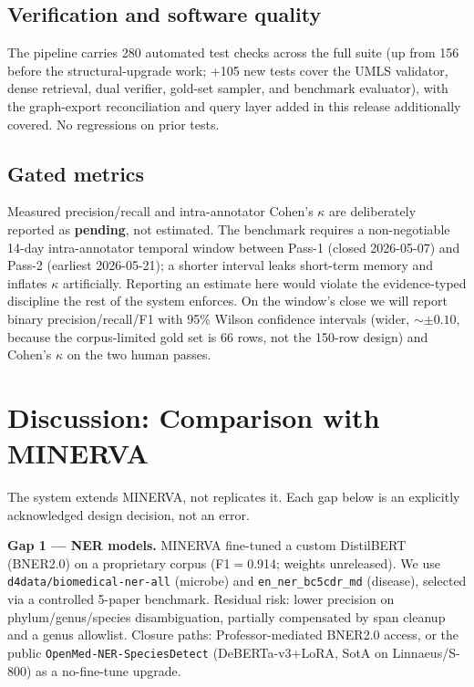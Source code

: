\documentclass[10pt,twocolumn,letterpaper]{article}
\begin{document}
\subsection{Verification and software quality}

The pipeline carries 280 automated test checks across the full suite (up from
156 before the structural-upgrade work; +105 new tests cover the UMLS
validator, dense retrieval, dual verifier, gold-set sampler, and benchmark
evaluator), with the graph-export reconciliation and query layer added in
this release additionally covered. No regressions on prior tests.

\subsection{Gated metrics}
\label{sec:eval}

Measured precision/recall and intra-annotator Cohen's $\kappa$ are
deliberately reported as \textbf{pending}, not estimated. The benchmark
requires a non-negotiable 14-day intra-annotator temporal window between
Pass-1 (closed 2026-05-07) and Pass-2 (earliest 2026-05-21); a shorter
interval leaks short-term memory and inflates $\kappa$ artificially.
Reporting an estimate here would violate the evidence-typed discipline the
rest of the system enforces. On the window's close we will report binary
precision/recall/F1 with 95\% Wilson confidence intervals (wider, $\sim\pm
0.10$, because the corpus-limited gold set is 66 rows, not the 150-row
design) and Cohen's $\kappa$ on the two human passes.

\section{Discussion: Comparison with MINERVA}

The system extends MINERVA, not replicates it. Each gap below is an
explicitly acknowledged design decision, not an error.

\noindent\textbf{Gap 1 --- NER models.} MINERVA fine-tuned a custom
DistilBERT (BNER2.0) on a proprietary corpus (F1$=$0.914; weights
unreleased). We use \texttt{d4data/biomedical-ner-all} (microbe) and
\texttt{en\_ner\_bc5cdr\_md} (disease), selected via a controlled 5-paper
benchmark. Residual risk: lower precision on phylum/genus/species
disambiguation, partially compensated by span cleanup and a genus allowlist.
Closure paths: Professor-mediated BNER2.0 access, or the public
\texttt{OpenMed-NER-SpeciesDetect} (DeBERTa-v3+LoRA, SotA on Linnaeus/S-800)
as a no-fine-tune upgrade.
\end{document}
